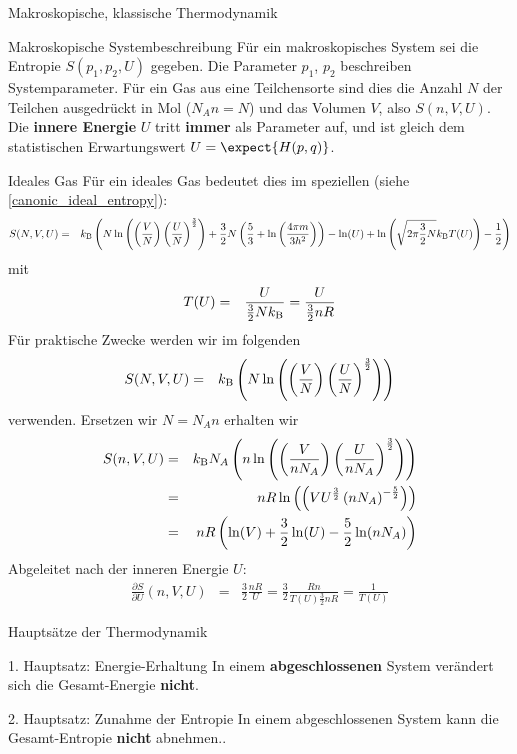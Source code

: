 \begin{chapter}{\titlestr}
\begin{section}{Makroskopische, klassische Thermodynamik}
\begin{subsection}{Makroskopische Systembeschreibung}
Für ein makroskopisches System sei die Entropie $S(p_1,p_2,U)$ gegeben. Die Parameter $p_1$, $p_2$ beschreiben Systemparameter. Für ein Gas aus eine Teilchensorte
sind dies die Anzahl $N$ der Teilchen ausgedrückt in Mol ($N_An=N$) und das Volumen $V$, also $S(n,V,U)$. Die \textbf{innere Energie} $U$ tritt \textbf{immer} als Parameter auf, und ist gleich dem statistischen Erwartungswert $U=\expect{H(p,q)}$.
\begin{subsubsection}{Ideales Gas}
Für ein ideales Gas bedeutet dies im speziellen (siehe \ref{canonic_ideal_entropy}):
\begin{eqnarray*}
S(N,V,U) &=&k_{\mathrm{B}}\left( N \ln \left( \left(\frac VN\right) \left(\frac{U}{N} \right)^{\frac 32}\right)+ {\frac 32}N\left( {\frac 53}+ \ln\left(\frac{4\pi m}{3h^2}\right)\right)-\ln(U)+\ln\left(\sqrt{2\pi \frac{3}{2}N}k_{\mathrm{B}} T(U)\right)-\frac{1}{2}\right)
\end{eqnarray*}
mit
\begin{eqnarray*}
T(U) &=& \frac{U}{ \frac{3}{2}Nk_{\mathrm{B}}}= \frac{U}{ \frac{3}{2}nR}
\end{eqnarray*}
Für praktische Zwecke werden wir im folgenden
\begin{eqnarray*}
S(N,V,U) &=&k_{\mathrm{B}}\left( N \ln \left( \left(\frac VN\right) \left(\frac{U}{N} \right)^{\frac 32}\right)\right)
\end{eqnarray*}
verwenden.
Ersetzen wir $N=N_An$ erhalten wir
\begin{eqnarray*}
S(n,V,U) &=&k_{\mathrm{B}} N_A\left( n \ln \left( \left(\frac {V}{nN_A}\right) \left(\frac{U}{nN_A} \right)^{\frac 32}\right)\right)\\
&=&nR \ln \left( \left(VU^\frac{3}{2}\left(nN_A\right)^{-\frac{5}{2}}\right)\right)\\
&=&nR \left( \ln(V)+\frac{3}{2}\ln(U)-\frac{5}{2}\ln(nN_A)\right)\\
\end{eqnarray*}
Abgeleitet nach der inneren Energie $U$:
\begin{eqnarray*}
\frac{\partial S}{\partial U}(n,V,U) &=& \frac{3}{2}\frac{nR}{U}=\frac{3}{2}\frac{Rn}{T(U)\frac{3}{2}nR}=\frac{1}{T(U)}
\end{eqnarray*}
\end{subsubsection}
\end{subsection}


\begin{subsection}{Hauptsätze der Thermodynamik}
\begin{subsubsection}{1. Hauptsatz: Energie-Erhaltung}
In einem \textbf{abgeschlossenen} System verändert sich die Gesamt-Energie \textbf{nicht}.
\end{subsubsection}
\begin{subsubsection}{2. Hauptsatz: Zunahme der Entropie}
In einem abgeschlossenen System kann die Gesamt-Entropie \textbf{nicht} abnehmen..
\end{subsubsection}
\end{subsection}



\end{section}
\end{chapter}
